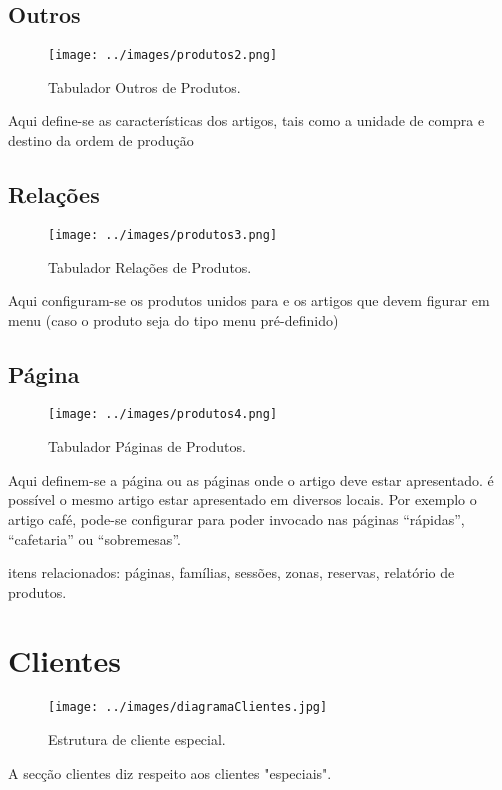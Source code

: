 \documentclass[a4paper,11pt,openany]{memoir}
\begin{document}
\subsection{Outros}
\begin{figure}
\texttt{[image: ../images/produtos2.png]}
\caption[Submanifold]{Tabulador Outros de Produtos.}
\end{figure}


Aqui define-se as características dos artigos, tais como a unidade de compra e destino da ordem de produção

\subsection{Relações}
\begin{figure}
\texttt{[image: ../images/produtos3.png]}
\caption[Submanifold]{Tabulador Relações de Produtos.}
\end{figure}


Aqui configuram-se os produtos unidos para e os artigos que devem figurar em menu (caso o produto seja do tipo menu pré-definido)

\subsection{Página}
\begin{figure}
\texttt{[image: ../images/produtos4.png]}
\caption[Submanifold]{Tabulador Páginas de Produtos.}
\end{figure}


Aqui definem-se a página ou as páginas onde o artigo deve estar apresentado.
é possível o mesmo artigo estar apresentado em diversos locais. Por exemplo o artigo café, pode-se configurar para poder invocado nas páginas “rápidas”, “cafetaria” ou “sobremesas”.

itens relacionados: páginas, famílias, sessões, zonas, reservas, relatório de produtos.

\section{Clientes}

\begin{figure}
\texttt{[image: ../images/diagramaClientes.jpg]}
\caption[Submanifold]{Estrutura de cliente especial.}
\end{figure}


A secção clientes diz respeito aos clientes "especiais". 
\end{document}
